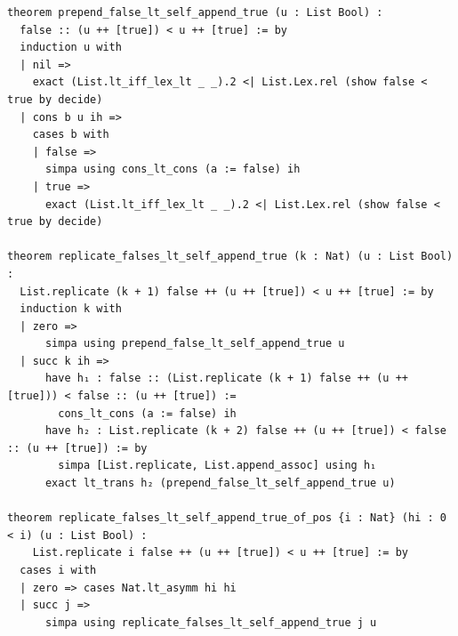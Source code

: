 \documentclass[11pt]{article}
\theoremstyle{definition}
\theoremstyle{remark}
\begin{document}
\begin{lstlisting}
theorem prepend_false_lt_self_append_true (u : List Bool) :
  false :: (u ++ [true]) < u ++ [true] := by
  induction u with
  | nil =>
    exact (List.lt_iff_lex_lt _ _).2 <| List.Lex.rel (show false < true by decide)
  | cons b u ih =>
    cases b with
    | false =>
      simpa using cons_lt_cons (a := false) ih
    | true =>
      exact (List.lt_iff_lex_lt _ _).2 <| List.Lex.rel (show false < true by decide)

theorem replicate_falses_lt_self_append_true (k : Nat) (u : List Bool) :
  List.replicate (k + 1) false ++ (u ++ [true]) < u ++ [true] := by
  induction k with
  | zero =>
      simpa using prepend_false_lt_self_append_true u
  | succ k ih =>
      have h₁ : false :: (List.replicate (k + 1) false ++ (u ++ [true])) < false :: (u ++ [true]) :=
        cons_lt_cons (a := false) ih
      have h₂ : List.replicate (k + 2) false ++ (u ++ [true]) < false :: (u ++ [true]) := by
        simpa [List.replicate, List.append_assoc] using h₁
      exact lt_trans h₂ (prepend_false_lt_self_append_true u)

theorem replicate_falses_lt_self_append_true_of_pos {i : Nat} (hi : 0 < i) (u : List Bool) :
    List.replicate i false ++ (u ++ [true]) < u ++ [true] := by
  cases i with
  | zero => cases Nat.lt_asymm hi hi
  | succ j =>
      simpa using replicate_falses_lt_self_append_true j u


\end{lstlisting}
\end{document}
